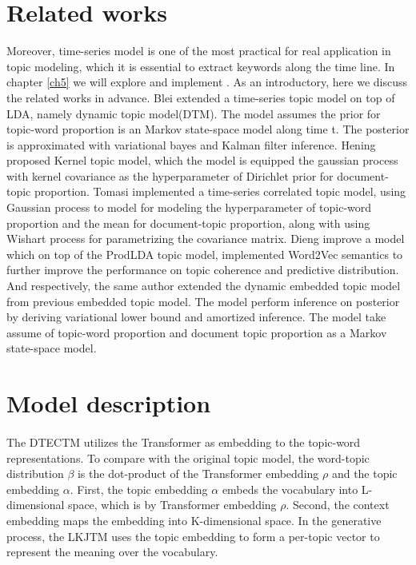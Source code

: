 \section{Related works}
Moreover, time-series model is one of the most practical for real application in topic modeling, which it is essential to extract keywords along the time line. In chapter \ref{ch5} we will explore and implement . As an introductory, here we discuss the related works in advance.
Blei \cite{blei_dynamic_2006} extended a time-series topic model on top of LDA, namely dynamic topic model(DTM). The model assumes the prior for topic-word proportion is an Markov state-space model along time t. The posterior is approximated with variational bayes and Kalman filter inference.
Hening\cite{hennig_kernel_2012} proposed Kernel topic model, which the model is equipped the gaussian process with kernel covariance as the hyperparameter of Dirichlet prior for document-topic proportion.
Tomasi\cite{tomasi_stochastic_2020} implemented a time-series correlated topic model, using Gaussian process to model for modeling the hyperparameter of topic-word proportion and the mean for document-topic proportion, along with using Wishart process for parametrizing the covariance matrix.
Dieng\cite{dieng_topic_2019} improve a model which on top of the ProdLDA topic model, implemented Word2Vec semantics to further improve the performance on topic coherence and predictive distribution. And respectively, the same author\cite{dieng_dynamic_2019} extended the dynamic embedded topic model from previous embedded topic model. The model perform inference on posterior by deriving variational lower bound and amortized inference. The model take assume of topic-word proportion and document topic proportion as a Markov state-space model.
\section{Model description}
\paragraph{}The DTECTM utilizes the Transformer as embedding to the topic-word representations. To compare with the original topic model, the word-topic distribution $ \beta $ is the dot-product of the Transformer embedding $ \rho $ and the topic embedding $ \alpha $.
First, the topic embedding $ \alpha $ embeds the vocabulary into L-dimensional space, which is by Transformer embedding $ \rho $. Second, the context embedding maps the embedding into K-dimensional space. 
In the generative process, the LKJTM uses the topic embedding to form a per-topic vector to represent the meaning over the vocabulary.

